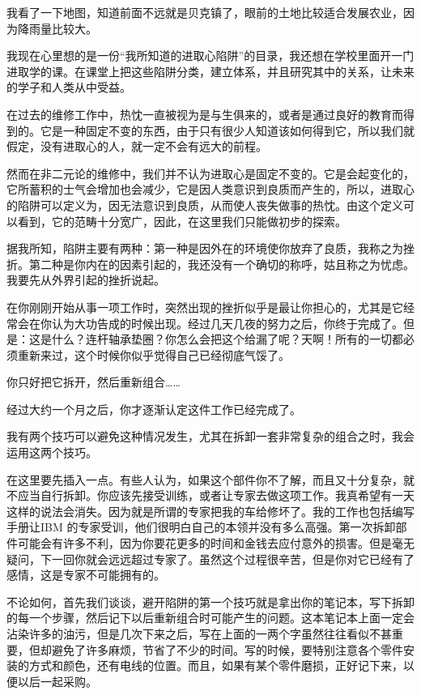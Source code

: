 \documentclass[UTF8]{article}
\begin{document}
\par 我看了一下地图，知道前面不远就是贝克镇了，眼前的土地比较适合发展农业，因为降雨量比较大。
\par 我现在心里想的是一份“我所知道的进取心陷阱”的目录，我还想在学校里面开一门进取学的课。在课堂上把这些陷阱分类，建立体系，并且研究其中的关系，让未来的学子和人类从中受益。
\par 在过去的维修工作中，热忱一直被视为是与生俱来的，或者是通过良好的教育而得到的。它是一种固定不变的东西，由于只有很少人知道该如何得到它，所以我们就假定，没有进取心的人，就一定不会有远大的前程。
\par 然而在非二元论的维修中，我们并不认为进取心是固定不变的。它是会起变化的，它所蓄积的士气会增加也会减少，它是因人类意识到良质而产生的，所以，进取心的陷阱可以定义为，因无法意识到良质，从而使人丧失做事的热忱。由这个定义可以看到，它的范畴十分宽广，因此，在这里我们只能做初步的探索。
\par 据我所知，陷阱主要有两种：第一种是因外在的环境使你放弃了良质，我称之为挫折。第二种是你内在的因素引起的，我还没有一个确切的称呼，姑且称之为忧虑。我要先从外界引起的挫折说起。
\par 在你刚刚开始从事一项工作时，突然出现的挫折似乎是最让你担心的，尤其是它经常会在你认为大功告成的时候出现。经过几天几夜的努力之后，你终于完成了。但是：这是什么？连杆轴承垫圈？你怎么会把这个给漏了呢？天啊！所有的一切都必须重新来过，这个时候你似乎觉得自己已经彻底气馁了。
\par 你只好把它拆开，然后重新组合……
\par 经过大约一个月之后，你才逐渐认定这件工作已经完成了。
\par 我有两个技巧可以避免这种情况发生，尤其在拆卸一套非常复杂的组合之时，我会运用这两个技巧。
\par 在这里要先插入一点。有些人认为，如果这个部件你不了解，而且又十分复杂，就不应当自行拆卸。你应该先接受训练，或者让专家去做这项工作。我真希望有一天这样的说法会消失。因为就是所谓的专家把我的车给修坏了。我的工作也包括编写手册让IBM 的专家受训，他们很明白自己的本领并没有多么高强。第一次拆卸部件可能会有许多不利，因为你要花更多的时间和金钱去应付意外的损害。但是毫无疑问，下一回你就会远远超过专家了。虽然这个过程很辛苦，但是你对它已经有了感情，这是专家不可能拥有的。
\par 不论如何，首先我们谈谈，避开陷阱的第一个技巧就是拿出你的笔记本，写下拆卸的每一个步骤，然后记下以后重新组合时可能产生的问题。这本笔记本上面一定会沾染许多的油污，但是几次下来之后，写在上面的一两个字虽然往往看似不甚重要，但却避免了许多麻烦，节省了不少的时间。写的时候，要特别注意各个零件安装的方式和颜色，还有电线的位置。而且，如果有某个零件磨损，正好记下来，以便以后一起采购。
\end{document}
